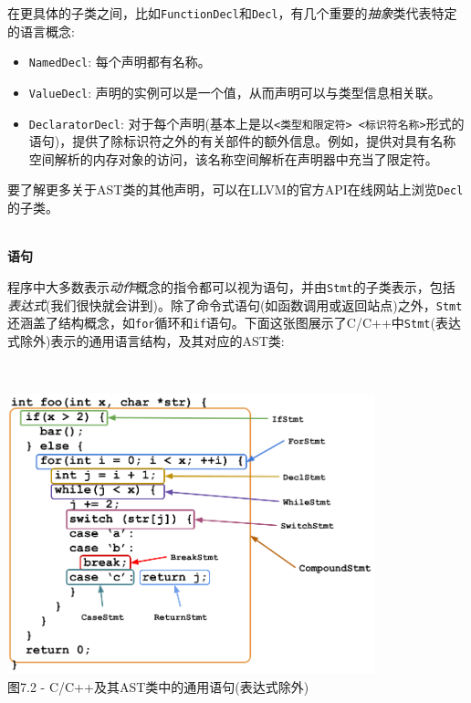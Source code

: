 在更具体的子类之间，比如\texttt{FunctionDecl}和\texttt{Decl}，有几个重要的\textit{抽象}类代表特定的语言概念:

\begin{itemize}
\item \texttt{NamedDecl}: 每个声明都有名称。
\item \texttt{ValueDecl}: 声明的实例可以是一个值，从而声明可以与类型信息相关联。
\item \texttt{DeclaratorDecl}: 对于每个声明(基本上是以\texttt{<类型和限定符> <标识符名称>}形式的语句)，提供了除标识符之外的有关部件的额外信息。例如，提供对具有名称空间解析的内存对象的访问，该名称空间解析在声明器中充当了限定符。
\end{itemize}

要了解更多关于AST类的其他声明，可以在LLVM的官方API在线网站上浏览\texttt{Decl}的子类。

\hspace*{\fill} \\ %
\noindent
\textbf{语句}

程序中大多数表示\textit{动作}概念的指令都可以视为语句，并由\texttt{Stmt}的子类表示，包括\textit{表达式}(我们很快就会讲到)。除了命令式语句(如函数调用或返回站点)之外，\texttt{Stmt}还涵盖了结构概念，如\texttt{for}循环和\texttt{if}语句。下面这张图展示了C/C++中\texttt{Stmt}(表达式除外)表示的通用语言结构，及其对应的AST类:

\hspace*{\fill} \\ %
\begin{center}
\includegraphics[width=0.8\textwidth]{content/2/chapter7/images/2.png}\\
图7.2 - C/C++及其AST类中的通用语句(表达式除外)
\end{center}

